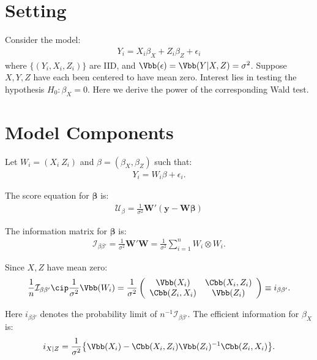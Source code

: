 




\section{Setting}
Consider the model:
\begin{align*}
Y_{i} = X_{i}\beta_{X} + Z_{i}\beta_{Z} + \epsilon_{i}
\end{align*}
where $\{(Y_{i}, X_{i}, Z_{i})\}$ are IID, and $\Vbb(\epsilon) = \Vbb(Y|X,Z) = \sigma^2$. Suppose $X, Y, Z$ have each been centered to have mean zero. Interest lies in testing the hypothesis $H_{0}:\beta_{X} = 0$. Here we derive the power of the corresponding Wald test. 

\section{Model Components}
Let $W_{i} = (X_{i}\ Z_{i})$ and $\beta = (\beta_{X}, \beta_{Z})$ such that:
\begin{align*}
Y_{i} = W_{i}\beta + \epsilon_{i}.
\end{align*}

The score equation for $\bm{\beta}$ is:
\begin{align*}
\mathcal{U}_{\beta} = \frac{1}{\sigma^2}\bm{W}'(\bm{y}-\bm{W}\bm{\beta})
\end{align*}

The information matrix for $\bm{\beta}$ is:
\begin{align*}
\mathcal{I}_{\beta\beta'} = \frac{1}{\sigma^2}\bm{W}'\bm{W} = \frac{1}{\sigma^2}\sum_{i=1}^{n}W_{i} \otimes W_{i}.
\end{align*}

Since $X,Z$ have mean zero:
\begin{align*}
\frac{1}{n}\mathcal{I}_{\beta\beta'} \cip \frac{1}{\sigma^2}\Vbb(W_{i}) = \frac{1}{\sigma^2}\left(
\begin{array}{c c}
\Vbb(X_{i}) & \Cbb(X_{i}, Z_{i}) \\
\Cbb(Z_{i}, X_{i}) & \Vbb(Z_{i})
\end{array}
\right) \equiv i_{\beta\beta'}.
\end{align*}

Here $i_{\beta\beta'}$ denotes the probability limit of $n^{-1}\mathcal{I}_{\beta\beta'}$. The efficient information for $\beta_{X}$ is:
\begin{align*}
i_{X|Z} = \frac{1}{\sigma^2}\big\{\Vbb(X_{i}) - \Cbb(X_{i}, Z_{i})\Vbb(Z_{i})^{-1}\Cbb(Z_{i}, X_{i})\big\}.
\end{align*}

